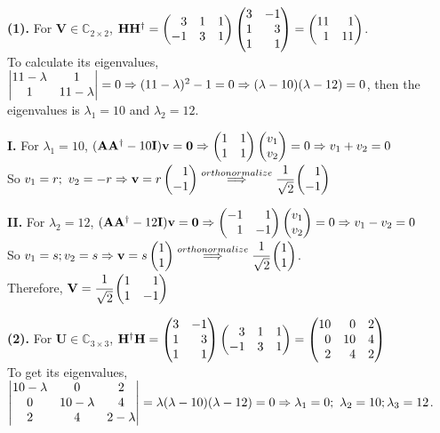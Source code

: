 \documentclass[12pt,a4paper]{article}
\begin{document}
    \newpage
    \textbf{(1).} For $\mathbf{V}\in \mathbb{C}_{2\times 2}$, $\mathbf{HH^\dagger}=\newvec{3&1&1\\-1&3&1}\newvec{3&-1\\1&3\\1&1}=\newvec{11&1\\1&11}$.\\
    To calculate its eigenvalues, $\begin{vmatrix} 11-\lambda&1\\1&11-\lambda \end{vmatrix}=0\Rightarrow(11-\lambda)^2-1=0\Rightarrow(\lambda-10)(\lambda-12)=0$, then the eigenvalues is $\lambda_1=10$ and $\lambda_2=12$. 

    \noindent \textbf{I.} For $\lambda_1=10$, $\mathbf{(AA^\dagger-\textnormal{10}I)v=0}\Rightarrow\newvec{1&1\\1&1}\newvec{v_1\\v_2}=0\Rightarrow v_1+v_2=0$\\
    So $v_1=r;\ v_2=-r\Rightarrow \mathbf{v}=r\newvec{1\\-1}\stackrel{orthonormalize}{\Longrightarrow}\cfrac{1}{\sqrt{2}}\newvec{1\\-1}$

    \noindent \textbf{II.} For $\lambda_2=12$, $\mathbf{(AA^\dagger-\textnormal{12}I)v=0}\Rightarrow\newvec{-1&1\\1&-1}\newvec{v_1\\v_2}=0\Rightarrow v_1-v_2=0$\\
    So $v_1=s; v_2=s\Rightarrow\mathbf{v}=s\newvec{1\\1}\stackrel{orthonormalize}{\Longrightarrow}\cfrac{1}{\sqrt{2}}\newvec{1\\1}$.\\
    Therefore, $\mathbf{V}=\cfrac{1}{\sqrt{2}}\newvec{1&1\\1&-1}$

    \textbf{(2).} For $\mathbf{U}\in \mathbb{C}_{3\times 3}$, $\mathbf{H^\dagger H}=\newvec{3&-1\\1&3\\1&1}\newvec{3&1&1\\-1&3&1}=\newvec{10&0&2\\0&10&4\\2&4&2}$\\
    To get its eigenvalues, $\begin{vmatrix} 10-\lambda&0&2\\0&10-\lambda&4\\2&4&2-\lambda \end{vmatrix}=\lambda(\lambda-10)(\lambda-12)=0\\ \Rightarrow \lambda_1=0;\ \lambda_2=10; \lambda_3=12$.
\end{document}
